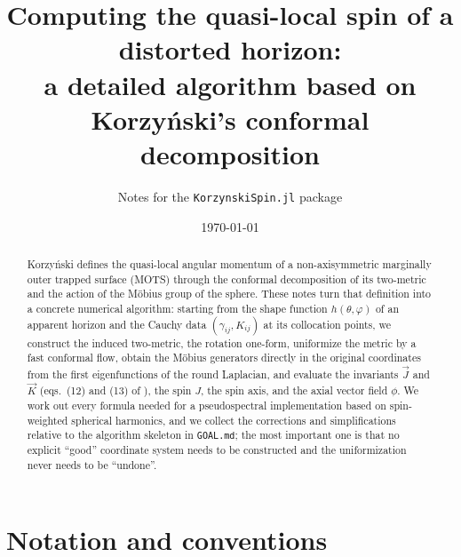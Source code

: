 \documentclass[11pt]{article}
\title{Computing the quasi-local spin of a distorted horizon:\\
a detailed algorithm based on Korzy\'nski's conformal decomposition}
\author{Notes for the \texttt{KorzynskiSpin.jl} package}
\date{\today}
\newcommand{\vJ}{\vec{J}}
\newcommand{\vK}{\vec{K}}
\begin{document}
\maketitle

\begin{abstract}
Korzy\'nski \cite{korzynski2007} defines the quasi-local angular momentum of a
non-axisymmetric marginally outer trapped surface (MOTS) through the conformal
decomposition of its two-metric and the action of the M\"obius group of the
sphere.  These notes turn that definition into a concrete numerical algorithm:
starting from the shape function $h(\theta,\varphi)$ of an apparent horizon and
the Cauchy data $(\gamma_{ij},K_{ij})$ at its collocation points, we construct
the induced two-metric, the rotation one-form, uniformize the metric by
a fast conformal flow, obtain the M\"obius generators directly in the
original coordinates from the first eigenfunctions of the round Laplacian, and
evaluate the invariants $\vJ$ and $\vK$ (eqs.\ (12) and (13) of
\cite{korzynski2007}), the spin $J$, the spin axis, and the axial vector field
$\phi$.  We work out every formula needed for a pseudospectral implementation
based on spin-weighted spherical harmonics, and we collect the corrections and
simplifications relative to the algorithm skeleton in \texttt{GOAL.md}; the
most important one is that no explicit ``good'' coordinate system needs to be
constructed and the uniformization never needs to be ``undone''.
\end{abstract}

\tableofcontents

\section{Notation and conventions}
\label{sec:conventions}
\end{document}

